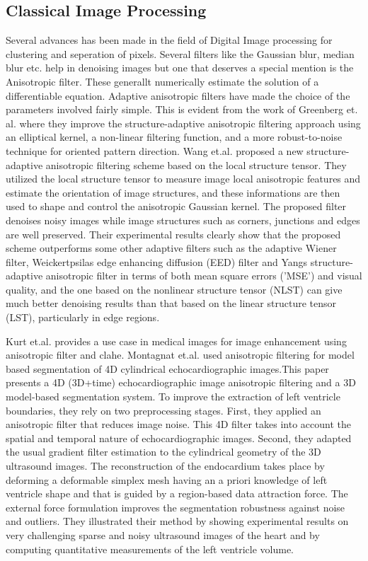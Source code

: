 \documentclass[19pt]{article}
\begin{document}
\subsection{Classical Image Processing}
Several advances has been made in the field of Digital Image processing for clustering and seperation of pixels. Several filters like the Gaussian blur, median blur etc. help in denoising images but one that deserves a special mention is the Anisotropic filter. These generallt numerically estimate the solution of a differentiable equation. Adaptive anisotropic filters have made the choice of the parameters involved fairly simple. This is evident from the work of Greenberg et. al. \cite{greenberg2006improved} where they improve the structure-adaptive anisotropic filtering approach using an elliptical kernel, a non-linear filtering function, and a more robust-to-noise technique for oriented pattern direction. Wang et.al. \cite{wang2008structure} proposed a new structure-adaptive anisotropic filtering scheme based on the local structure tensor. They utilized the local structure tensor to measure image local anisotropic features and estimate the orientation of image structures, and these informations are then used to shape and control the anisotropic Gaussian kernel. The proposed filter denoises noisy images while image structures such as corners, junctions and edges are well preserved. Their experimental results clearly show that the proposed scheme outperforms some other adaptive filters such as the adaptive Wiener filter, Weickertpsilas edge enhancing diffusion (EED) filter and Yangs structure-adaptive anisotropic filter in terms of both mean square errors ('MSE') and visual quality, and the one based on the nonlinear structure tensor (NLST) can give much better denoising results than that based on the linear structure tensor (LST), particularly in edge regions.

Kurt et.al. \cite{kurt2012medical} provides a use case in medical images for image enhancement using anisotropic filter and clahe. Montagnat et.al. \cite{montagnat2003anisotropic} used anisotropic filtering for model based segmentation of 4D cylindrical echocardiographic images.This paper presents a 4D (3D+time) echocardiographic image anisotropic filtering and a 3D model-based segmentation system. To improve the extraction of left ventricle boundaries, they rely on two preprocessing stages. First, they applied an anisotropic filter that reduces image noise. This 4D filter takes into account the spatial and temporal nature of echocardiographic images. Second, they adapted the usual gradient filter estimation to the cylindrical geometry of the 3D ultrasound images. The reconstruction of the endocardium takes place by deforming a deformable simplex mesh having an a priori knowledge of left ventricle shape and that is guided by a region-based data attraction force. The external force formulation improves the segmentation robustness against noise and outliers. They illustrated their method by showing experimental results on very challenging sparse and noisy ultrasound images of the heart and by computing quantitative measurements of the left ventricle volume. 
\end{document}

